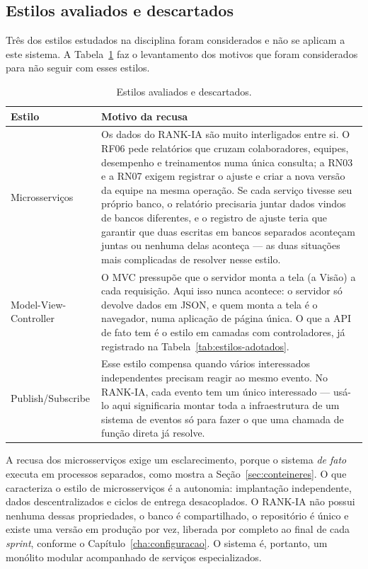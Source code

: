 \documentclass[a4paper,12pt,oneside,openany]{book}
\begin{document}
\subsection{Estilos avaliados e descartados}

Três dos estilos estudados na disciplina foram considerados e não se aplicam a
este sistema. A Tabela~\ref{tab:estilos-descartados} faz o levantamento dos motivos
que foram considerados para não seguir com esses estilos.

\begin{table}[H]
\centering
\small
\caption{Estilos avaliados e descartados.}
\label{tab:estilos-descartados}
\begin{tabularx}{0.97\textwidth}{p{} X}
\toprule
\textbf{Estilo} & \textbf{Motivo da recusa} \\
\midrule
Microsserviços & Os dados do RANK-IA são muito interligados entre si. O RF06
pede relatórios que cruzam colaboradores, equipes, desempenho e treinamentos
numa única consulta; a RN03 e a RN07 exigem registrar o ajuste e criar a nova
versão da equipe na mesma operação. Se cada serviço tivesse seu próprio banco,
o relatório precisaria juntar dados vindos de bancos diferentes, e o registro
de ajuste teria que garantir que duas escritas em bancos separados aconteçam
juntas ou nenhuma delas aconteça --- as duas situações mais complicadas de
resolver nesse estilo. \\
Model-View-Controller & O MVC pressupõe que o servidor monta a tela (a Visão)
a cada requisição. Aqui isso nunca acontece: o servidor só devolve dados em
JSON, e quem monta a tela é o navegador, numa aplicação de página única. O que
a API de fato tem é o estilo em camadas com controladores, já registrado na
Tabela~\ref{tab:estilos-adotados}. \\
Publish/Subscribe & Esse estilo compensa quando vários interessados
independentes precisam reagir ao mesmo evento. No RANK-IA, cada evento tem um
único interessado --- usá-lo aqui significaria montar toda a infraestrutura de
um sistema de eventos só para fazer o que uma chamada de função direta já
resolve. \\
\bottomrule
\end{tabularx}
\end{table}

A recusa dos microsserviços exige um esclarecimento, porque o sistema
\textit{de fato} executa em processos separados, como mostra a
Seção~\ref{sec:conteineres}. O que caracteriza o estilo de microsserviços é a 
autonomia: implantação independente, dados descentralizados e ciclos de entrega
desacoplados. O RANK-IA não possui nenhuma dessas propriedades, o banco é
compartilhado, o repositório é único e existe uma versão em produção por vez,
liberada por completo ao final de cada \textit{sprint}, conforme o
Capítulo~\ref{cha:configuracao}. O sistema é, portanto, um
monólito modular acompanhado de serviços especializados.
\end{document}
